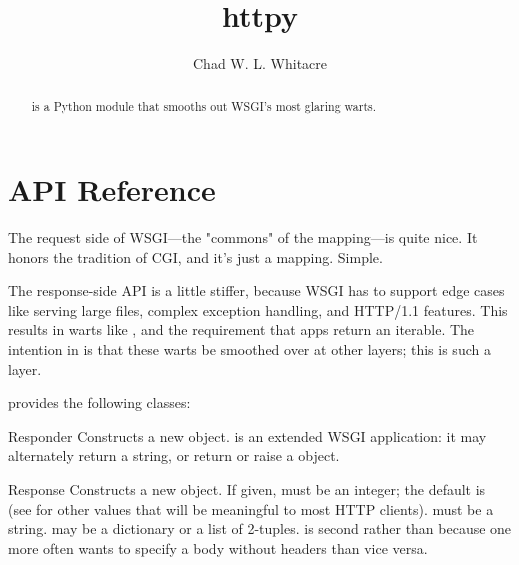 \documentclass{manual}
\title{httpy}
\author{Chad W. L. Whitacre}
\begin{document}
\maketitle

\begin{abstract}

\noindent
{} is a Python module that smooths out WSGI's most glaring warts.

\end{abstract}


\chapter{API Reference \label{api}}

The request side of WSGI---the "commons" of the  mapping---is quite
nice. It honors the tradition of CGI, and it's just a mapping. Simple.

The response-side API is a little stiffer, because WSGI has to support edge
cases like serving large files, complex exception handling, and HTTP/1.1
features. This results in warts like , and the requirement
that apps return an iterable. The intention in  is that these warts be smoothed
over at other layers; this is such a layer.

 provides the following classes:

\begin{classdesc}{Responder}{}
Constructs a new  object.  is an extended WSGI
application: it may alternately return a string, or return or raise a
 object.
\end{classdesc}

\begin{classdesc}{Response}{  }
Constructs a new  object. If given,  must be an
integer; the default is
(see  for other values
that will be meaningful to most HTTP clients).  must be a string.
 may be a dictionary or a list of 2-tuples.  is second
rather than  because one more often wants to specify a body without
headers than vice versa.
\end{classdesc}
\end{document}
